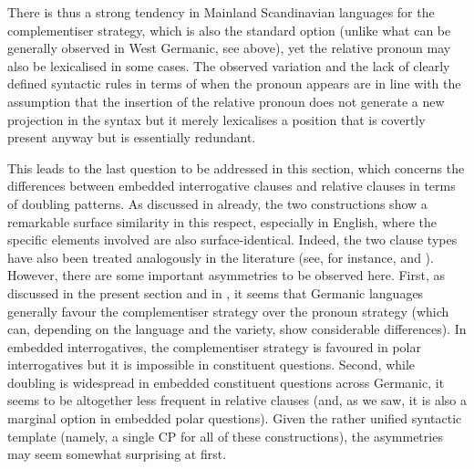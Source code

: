 There is thus a strong tendency in Mainland Scandinavian languages for the complementiser strategy, which is also the standard option (unlike what can be generally observed in West Germanic, see above), yet the relative pronoun may also be lexicalised in some cases. The observed variation and the lack of clearly defined syntactic rules in terms of when the pronoun appears are in line with the assumption that the insertion of the relative pronoun does not generate a new projection in the syntax but it merely lexicalises a position that is covertly present anyway but is essentially redundant.

This leads to the last question to be addressed in this section, which concerns the differences between embedded interrogative clauses and relative clauses in terms of doubling patterns. As discussed in  already, the two constructions show a remarkable surface similarity in this respect, especially in English, where the specific elements involved are also surface-identical. Indeed, the two clause types have also been treated analogously in the literature (see, for instance, \citealt{chomskylasnik1977} and \citealt{chomsky1977}). However, there are some important asymmetries to be observed here. First, as discussed in the present section and in , it seems that Germanic languages generally favour the complementiser strategy over the pronoun strategy (which can, depending on the language and the variety, show considerable differences). In embedded interrogatives, the complementiser strategy is favoured in polar interrogatives but it is impossible in constituent questions. Second, while doubling is widespread in embedded constituent questions across Germanic, it seems to be altogether less frequent in relative clauses (and, as we saw, it is also a marginal option in embedded polar questions). Given the rather unified syntactic template (namely, a single CP for all of these constructions), the asymmetries may seem somewhat surprising at first.

